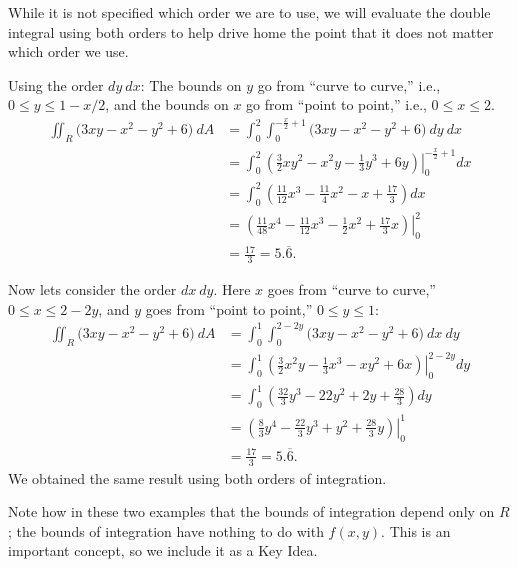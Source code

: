 {While it is not specified which order we are to use, we will evaluate the double integral using both orders to help drive home the point that it does not matter which order we use.


Using the order $dy\ dx$:
The bounds on $y$ go from ``curve to curve,'' i.e., $0\leq y\leq 1-x/2$, and the bounds on $x$ go from ``point to point,'' i.e., $0\leq x\leq 2$.
\begin{align*}
\iint_R (3xy-x^2-y^2+6\big)\ dA &= \int_0^2\int_0^{-\frac x2+1} (3xy-x^2-y^2+6\big)\ dy\ dx\\
		&= \int_0^2\left.\left(\frac32xy^2-x^2y-\frac13y^3+6y\right)\right|_0^{-\frac x2+1}dx\\
		&= \int_0^2 \left(\frac{11}{12}x^3-\frac{11}{4}x^2-x+\frac{17}3\right)dx \\
		&= \left.\left(\frac{11}{48}x^4-\frac{11}{12}x^3-\frac12x^2+\frac{17}3x\right)\right|_0^2\\
		&= \frac{17}3=5.\overline{6}.
\end{align*}

Now lets consider the order $dx \ dy$. Here $x$ goes from ``curve to curve,'' $0\leq x\leq 2-2y$, and $y$ goes from ``point to point,'' $0\leq y\leq 1$:
\begin{align*}
\iint_R (3xy-x^2-y^2+6\big)\ dA &= \int_0^1\int_0^{2-2y} (3xy-x^2-y^2+6\big)\ dx\ dy\\
		&= \int_0^1\left.\left(\frac32x^2y-\frac13x^3-xy^2+6x\right)\right|_0^{2-2y} dy\\
		&= \int_0^1\left(\frac{32}3y^3-22y^2+2y+\frac{28}3\right)dy\\
		&=\left.\left(\frac83y^4-\frac{22}3y^3+y^2+\frac{28}3y\right)\right|_0^1\\
		&=\frac{17}3=5.\overline{6}.
\end{align*}
We obtained the same result using both orders of integration.}

Note how in these two examples that the bounds of integration depend only on $R$; the bounds of integration have nothing to do with $f(x,y)$. This is an important concept, so we include it  as a Key Idea.

